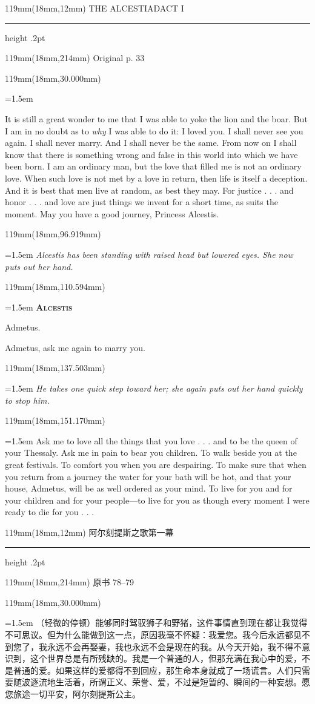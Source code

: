 \documentclass{article}
\newcommand{\ENsetup}{\normalfont\color{ink}\fontsize{11}{16.5}\selectfont\emergencystretch=1.5em}
\newcommand{\ZHsetup}{\normalfont\color{ink}\fontsize{10.5}{17}\selectfont\emergencystretch=1.5em}
\newcommand{\ENspeaker}[1]{{\fontsize{9.8}{13}\selectfont\scshape\bfseries #1}\par\vspace{3pt}}
\newcommand{\ENstage}[1]{\par\noindent{\itshape #1}\par}
\newcommand{\Block}[3]{\begin{textblock*}{119mm}(18mm,#1mm){#2 #3\par}\end{textblock*}}
\newcommand{\Heading}[3]{%
  \begin{textblock*}{119mm}(18mm,12mm)
    \color{quiet}\fontsize{7.5}{10}\selectfont
    #1\hfill #2\par\vspace{3mm}\hrule height .2pt
  \end{textblock*}
  \begin{textblock*}{119mm}(18mm,214mm)
    \color{quiet}\fontsize{7}{10}\selectfont #3\hfill\thepage
  \end{textblock*}
}
\begin{document}
\newpage
\null
\Heading{THE ALCESTIAD}{ACT I}{Original p. 33}
\Block{30.000}{\ENsetup}{\ENstage{Slight pause.}
It is still a great wonder to me that I was able to yoke the lion and the boar. But I am in no doubt as to \textit{why} I was able to do it: I loved you. I shall never see you again. I shall never marry. And I shall never be the same. From now on I shall know that there is something wrong and false in this world into which we have been born. I am an ordinary man, but the love that filled me is not an ordinary love. When such love is not met by a love in return, then life is itself a deception. And it is best that men live at random, as best they may. For justice . . . and honor . . . and love are just things we invent for a short time, as suits the moment. May you have a good journey, Princess Alcestis.\par}
\Block{96.919}{\ENsetup}{\itshape 
Alcestis has been standing with raised head but lowered eyes. She now puts out her hand.\par}
\Block{110.594}{\ENsetup}{\ENspeaker{Alcestis}
Admetus.\par
\ENstage{Slight pause.}
Admetus, ask me again to marry you.\par}
\Block{137.503}{\ENsetup}{\itshape 
He takes one quick step toward her; she again puts out her hand quickly to stop him.\par}
\Block{151.170}{\ENsetup}{Ask me to love all the things that you love . . . and to be the queen of your Thessaly. Ask me in pain to bear you children. To walk beside you at the great festivals. To comfort you when you are despairing. To make sure that when you return from a journey the water for your bath will be hot, and that your house, Admetus, will be as well ordered as your mind. To live for you and for your children and for your people—to live for you as though every moment I were ready to die for you . . .\par}
\newpage
\null
\Heading{阿尔刻提斯之歌}{第一幕}{原书 78–79}
\Block{30.000}{\ZHsetup}{{\kai （轻微的停顿）}能够同时驾驭狮子和野猪，这件事情直到现在都让我觉得不可思议。但为什么能做到这一点，原因我毫不怀疑：我爱您。我今后永远都见不到您了，我永远不会再娶妻，我也永远不会是现在的我。从今天开始，我不得不意识到，这个世界总是有所残缺的。我是一个普通的人，但那充满在我心中的爱，不是普通的爱。如果这样的爱都得不到回应，那生命本身就成了一场谎言。人们只需要随波逐流地生活着，所谓正义、荣誉、爱，不过是短暂的、瞬间的一种妄想。愿您旅途一切平安，阿尔刻提斯公主。\par }
\end{document}
